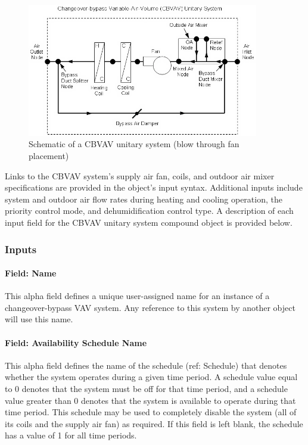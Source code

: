 \begin{figure}[hbtp] %
\centering
\includegraphics[width=0.9\textwidth, height=0.9\textheight, keepaspectratio=true]{media/image309.png}
\caption{Schematic of a CBVAV unitary system (blow through fan placement) \protect \label{fig:schematic-of-a-cbvav-unitary-system-blow}}
\end{figure}

Links to the CBVAV system's supply air fan, coils, and outdoor air mixer specifications are provided in the object's input syntax. Additional inputs include system and outdoor air flow rates during heating and cooling operation, the priority control mode, and dehumidification control type. A description of each input field for the CBVAV unitary system compound object is provided below.

\subsubsection{Inputs}\label{inputs-8-027}

\paragraph{Field: Name}\label{field-name-9-020}

This alpha field defines a unique user-assigned name for an instance of a changeover-bypass VAV system. Any reference to this system by another object will use this name.

\paragraph{Field: Availability Schedule Name}\label{field-availability-schedule-name-8-004}

This alpha field defines the name of the schedule (ref: Schedule) that denotes whether the system operates during a given time period. A schedule value equal to 0 denotes that the system must be off for that time period, and a schedule value greater than 0 denotes that the system is available to operate during that time period. This schedule may be used to completely disable the system (all of its coils and the supply air fan) as required. If this field is left blank, the schedule has a value of 1 for all time periods.

